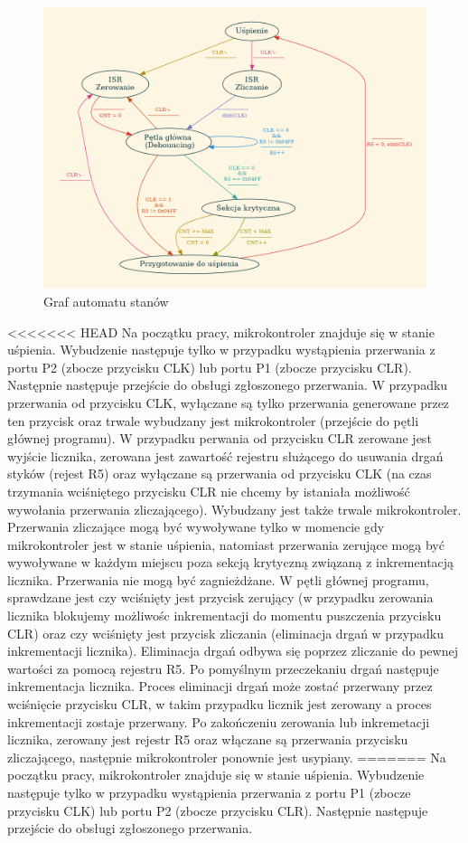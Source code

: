 \documentclass[fleqn]{article}
\begin{document}
\begin{figure}[H]
	\centering
	\includegraphics[width=\textwidth]{assets/graph.png}
	\caption{Graf automatu stanów}
	\label{fig:graph}
\end{figure}


<<<<<<< HEAD
Na początku pracy, mikrokontroler znajduje się w stanie uśpienia. Wybudzenie następuje tylko w przypadku wystąpienia przerwania z portu P2 (zbocze przycisku CLK) lub portu P1 (zbocze przycisku CLR). Następnie następuje przejście do obsługi zgłoszonego przerwania. W przypadku przerwania od przycisku CLK, wyłączane są tylko przerwania generowane przez ten przycisk oraz trwale wybudzany jest mikrokontroler (przejście do pętli głównej programu). W przypadku perwania od przycisku CLR zerowane jest wyjście licznika, zerowana jest zawartość rejestru służącego do usuwania drgań styków (rejest R5) oraz wyłączane są przerwania od przycisku CLK (na czas trzymania wciśniętego przycisku CLR nie chcemy by istaniała możliwość wywołania przerwania zliczającego). Wybudzany jest także trwale mikrokontroler. Przerwania zliczające mogą być wywoływane tylko w momencie gdy mikrokontroler jest w stanie uśpienia, natomiast przerwania zerujące mogą być wywoływane w każdym miejscu poza sekcją krytyczną związaną z inkrementacją licznika. Przerwania nie mogą być zagnieżdżane. W pętli głównej programu, sprawdzane jest czy wciśnięty jest przycisk zerujący (w przypadku zerowania licznika blokujemy możliwośc inkrementacji do momentu puszczenia przycisku CLR) oraz czy wciśnięty jest przycisk zliczania (eliminacja drgań w przypadku inkrementacji licznika). Eliminacja drgań odbywa się poprzez zliczanie do pewnej wartości za pomocą rejestru R5. Po pomyślnym przeczekaniu drgań następuje inkrementacja licznika. Proces eliminacji drgań może zostać przerwany przez wciśnięcie przycisku CLR, w takim przypadku licznik jest zerowany a proces inkrementacji zostaje przerwany. Po zakończeniu zerowania lub inkremetacji licznika, zerowany jest rejestr R5 oraz włączane są przerwania przycisku zliczającego, następnie mikrokontroler ponownie jest usypiany.
=======
Na początku pracy, mikrokontroler znajduje się w stanie uśpienia. Wybudzenie następuje tylko w przypadku wystąpienia przerwania z portu P1 (zbocze przycisku CLK) lub portu P2 (zbocze przycisku CLR). Następnie następuje przejście do obsługi zgłoszonego przerwania.
\end{document}
